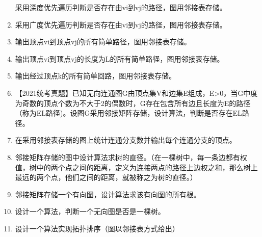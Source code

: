 \documentclass[lang=cn,newtx,10pt,scheme=chinese]{../../elegantbook}
\begin{document}
\begin{enumerate}
  采用深度优先遍历判断是否存在由vi到vj的路径，图用邻接表存储。
  
\vspace{5cm}
\item
  
  采用广度优先遍历判断是否存在由vi到vj的路径，图用邻接表存储。
  
\vspace{5cm}
\item
  
  输出顶点vi到顶点vj的所有简单路径，图用邻接表存储。
  
\vspace{5cm}
\item
  
  输出顶点vi到顶点vj的长度为L的所有简单路径，图用邻接表存储。
  
\vspace{5cm}
\item
  
  输出经过顶点k的所有简单回路，图用邻接表存储。
  
\vspace{5cm}
\item
  
  【2021统考真题】已知无向连通图G由顶点集V和边集E组成，\textbar E\textbar\textgreater0，当G中度为奇数的顶点个数为不大于2的偶数时，G存在包含所有边且长度为\textbar E\textbar 的路径（称为EL路径)。设图G采用邻接矩阵存储，设计算法，判断是否存在EL路径。
  
\vspace{5cm}
\item
  
  在采用邻接表存储的图上统计连通分支数并输出每个连通分支的顶点。
  
\vspace{5cm}
\item
  
  邻接矩阵存储的图中设计算法求树的直径。（在一棵树中，每一条边都有权值，树中的两个点之间的距离，定义为连接两点的路径上边权之和，那么树上最远的两个点，他们之间的距离，就被称之为树的直径。）
  
\vspace{5cm}
\item
  
  邻接矩阵存储一个有向图，设计算法求该有向图的所有根。
  
\vspace{5cm}
\item
  
  设计一个算法，判断一个无向图是否是一棵树。
  
\vspace{5cm}
\item
  
  设计一个算法实现拓扑排序（图以邻接表方式给出）
  

\end{enumerate}
\end{document}
